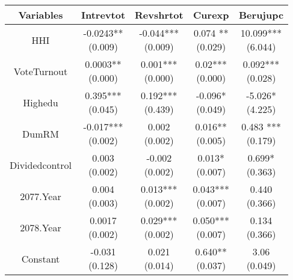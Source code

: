 \begin{table}[ht]
\centering
\begin{tabular}{|ccccc|}
\hline
\textbf{Variables} & \textbf{Intrevtot} & \textbf{Revshrtot} & \textbf{Curexp} & \textbf{Berujupc} \\
\hline
HHI & \makecell{-0.0243** \\ (0.009)} & \makecell{-0.044*** \\ (0.009)} & \makecell{0.074 **\\ (0.029)} & \makecell{10.099*** \\ (6.044)} \\

VoteTurnout& \makecell{0.0003** \\ (0.000)} & \makecell{0.001*** \\ (0.000)} & \makecell{0.02***\\ (0.000)} & \makecell{0.092*** \\ (0.028)} \\

Highedu & \makecell{0.395*** \\ (0.045)} & \makecell{0.192*** \\ (0.439)} & \makecell{-0.096* \\ (0.049)} & \makecell{-5.026* \\ (4.225)} \\
DumRM & \makecell{-0.017*** \\ (0.002)} & \makecell{0.002\\ (0.002)} & \makecell{0.016**\\ (0.005)} & \makecell{0.483 ***\\ (0.179)} \\
Dividedcontrol & \makecell{0.003 \\ (0.002)} & \makecell{-0.002\\ (0.002)} & \makecell{0.013*\\ (0.007)} & \makecell{0.699*\\ (0.363)} \\
2077.Year& \makecell{0.004 \\ (0.003)} & \makecell{0.013***\\ (0.002)} & \makecell{0.043***\\ (0.007)} & \makecell{0.440\\ (0.366)} \\
2078.Year & \makecell{0.0017 \\ (0.002)} & \makecell{0.029***\\ (0.002)} & \makecell{0.050***\\ (0.007)} & \makecell{0.134\\ (0.366)} \\
Constant & \makecell{-0.031 \\ (0.128)} & \makecell{0.021 \\ (0.014)} & \makecell{0.640** \\ (0.037)} & \makecell{3.06 \\ (0.049)} \\\hline


\end{tabular}
\end{table}
